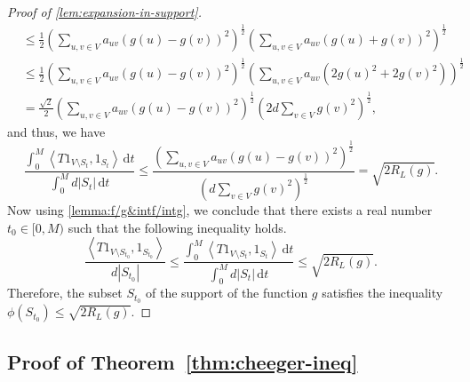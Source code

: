 \documentclass[12pt,a4paper,bold]{thesis}
\theoremstyle{definition}
\newcommand*{\abs}[1]{\left\vert #1 \right\vert}
\newcommand*{\ip}[2]{\left\langle #1 , #2 \right\rangle}
\begin{document}
\begin{proof}[Proof of \cref{lem:expansion-in-support}]
\begin{align*}
        & \leq
        \frac{1}{2} \left(\sum_{u,v \in V} a_{uv} (g(u) - g(v))^2\right)^\frac{1}{2}
        \left(\sum_{u,v \in V} a_{uv} (g(u) + g(v))^2\right)^\frac{1}{2}
        \tag{using the Cauchy--Schwarz inequality}
        \\
        & \leq
        \frac{1}{2} \left(\sum_{u,v \in V} a_{uv} (g(u) - g(v))^2\right)^\frac{1}{2}
        \left(\sum_{u,v \in V} a_{uv} (2g(u)^2 + 2g(v)^2)\right)^\frac{1}{2}
        \\
        & =
        \frac{\sqrt{2}}{2} \left(\sum_{u,v \in V} a_{uv} (g(u) - g(v))^2\right)^\frac{1}{2}
        \left(2d \sum_{v \in V} g(v)^2\right)^\frac{1}{2},
    \end{align*}
    and thus, we have
    \begin{equation*}
        \frac{\int_{0}^{M} \ip{T1_{V \setminus S_t}}{1_{S_t}}\, \mathrm{d}t}
        {\int_{0}^{M} d \abs{S_t}\, \mathrm{d}t}
        \leq \frac{\left(\sum_{u,v \in V} a_{uv} (g(u) - g(v))^2\right)^\frac{1}{2}}
        {\left(d \sum_{v \in V} g(v)^2\right)^\frac{1}{2}} = \sqrt{2R_L(g)}.
    \end{equation*}
    Now using \cref{lemma:f/g&intf/intg}, we conclude that there exists 
	a real number $t_0 \in [0,M)$ such that the following inequality holds.
    \begin{equation*}
        \frac{\ip{T1_{V \setminus S_{t_0}}}{1_{S_{t_0}}}}{d \abs{S_{t_0}}} 
        \leq \frac{\int_{0}^{M} \ip{T1_{V \setminus S_t}}{1_{S_t}}\, \mathrm{d}t}
        {\int_{0}^{M} d \abs{S_t}\, \mathrm{d}t} \leq \sqrt{2R_L(g)}.
    \end{equation*}
    Therefore, the subset $S_{t_0}$ of the support of the function $g$ satisfies
    the inequality $\phi(S_{t_0}) \leq \sqrt{2R_L(g)}$.
\end{proof}

\subsection{Proof of Theorem~\ref{thm:cheeger-ineq}}
\end{document}
